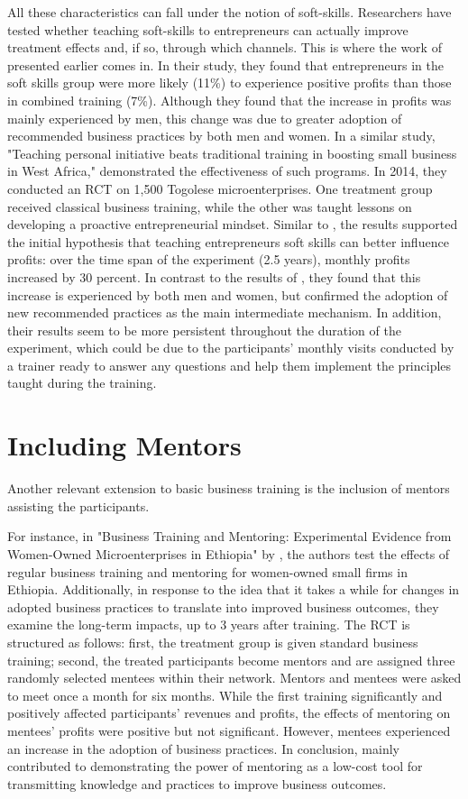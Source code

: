 All these characteristics can fall under the notion of soft-skills. Researchers have tested whether teaching soft-skills to entrepreneurs can actually improve treatment effects and, if so, through which channels. This is where the work of \cite{Ubfal2022} presented earlier comes in. In their study, they found that entrepreneurs in the soft skills group were more likely (11\%) to experience positive profits than those in combined training (7\%). Although they found that the increase in profits was mainly experienced by men, this change was due to greater adoption of recommended business practices by both men and women. In a similar study, "Teaching personal initiative beats traditional training in boosting small business in West Africa," \cite{Campos2017} demonstrated the effectiveness of such programs. In 2014, they conducted an RCT on 1,500 Togolese microenterprises. One treatment group received classical business training, while the other was taught lessons on developing a proactive entrepreneurial mindset. Similar to \cite{Ubfal2022}, the results supported the initial hypothesis that teaching entrepreneurs soft skills can better influence profits: over the time span of the experiment (2.5 years), monthly profits increased by 30 percent. In contrast to the results of \cite{Ubfal2022}, they found that this increase is experienced by both men and women, but confirmed the adoption of new recommended practices as the main intermediate mechanism. In addition, their results seem to be more persistent throughout the duration of the experiment, which could be due to the participants' monthly visits conducted by a trainer ready to answer any questions and help them implement the principles taught during the training.

\section{Including Mentors}

Another relevant extension to basic business training is the inclusion of mentors assisting the participants.

For instance, in "Business Training and Mentoring: Experimental Evidence from Women-Owned Microenterprises in Ethiopia" by \cite{Bakhtiar2022}, the authors test the effects of regular business training and mentoring for women-owned small firms in Ethiopia. Additionally, in response to the idea that it takes a while for changes in adopted business practices to translate into improved business outcomes, they examine the long-term impacts, up to 3 years after training. The RCT is structured as follows: first, the treatment group is given standard business training; second, the treated participants become mentors and are assigned three randomly selected mentees within their network. Mentors and mentees were asked to meet once a month for six months. While the first training significantly and positively affected participants' revenues and profits, the effects of mentoring on mentees' profits were positive but not significant. However, mentees experienced an increase in the adoption of business practices. In conclusion, \cite{Bakhtiar2022} mainly contributed to demonstrating the power of mentoring as a low-cost tool for transmitting knowledge and practices to improve business outcomes.
